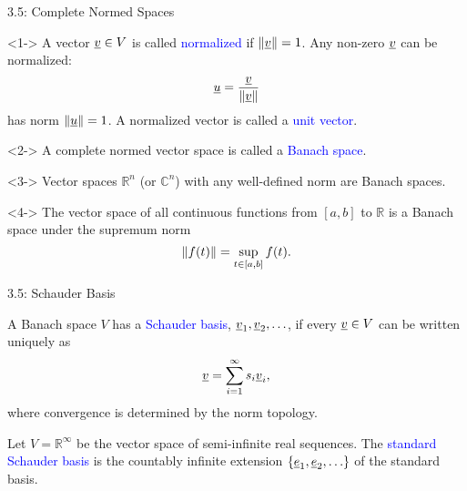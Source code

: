 \documentclass[10pt,letterpaper,english]{beamer}
\begin{document}
\begin{frame}{3.5: Complete Normed Spaces}

\begin{definition}<1->
A vector $\underline{v} \in V$ is called \textcolor{blue}{normalized} if $\left\| \underline{v} \right\| = 1$.
Any non-zero $\underline{v}$ can be normalized: \vspace{-1mm}
\begin{equation*}
\underline{u} = \frac{\underline{v}}{\left\| \underline{v} \right\|}
\end{equation*}
has norm $\left\| \underline{u} \right\| = 1$.
A normalized vector is called a \textcolor{blue}{unit vector}.
\end{definition}

\begin{definition}<2->
A complete normed vector space is called a \textcolor{blue}{Banach space}.
\end{definition}

\begin{example}<3->
Vector spaces $\mathbb{R}^n$ (or $\mathbb{C}^n$) with any well-defined norm are Banach spaces.
\end{example}

\begin{example}<4->
The vector space of all continuous functions from $[a,b]$ to $\mathbb{R}$ is a Banach space under the supremum norm \vspace{-2mm}
\[ \left\| f(t) \right\| = \sup_{t\in [a,b]} f(t). \vspace*{-1mm}\]
\end{example}

\end{frame}

\begin{frame}{3.5: Schauder Basis}

\begin{definition}
A Banach space $V$ has a \textcolor{blue}{Schauder basis}, $\underline{v}_1, \underline{v}_2, \ldots$, if every $\underline{v} \in V$ can be written uniquely as
\[ \underline{v} = \sum_{i=1}^\infty s_i \underline{v}_i, \]
where convergence is determined by the norm topology.
\end{definition}

\begin{example}
Let $V = \mathbb{R}^\infty$ be the vector space of semi-infinite real sequences.
The \textcolor{blue}{standard Schauder basis} is the countably infinite extension $\{\underline{e}_1 ,\underline{e}_2, \ldots \}$ of the standard basis.
\end{example}


\end{frame}
\end{document}
